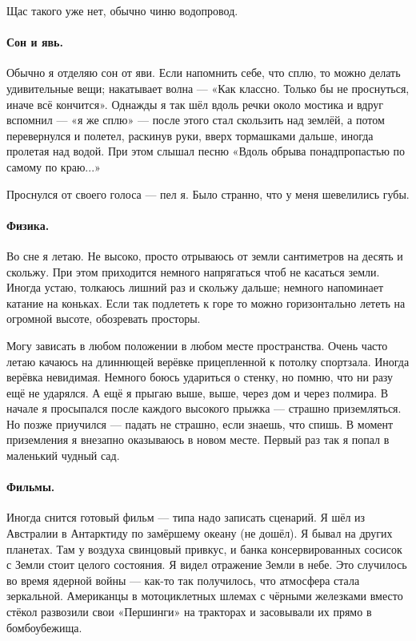\documentclass{book}
\begin{document}
Щас такого уже нет, обычно чиню водопровод.

\paragraph{Сон и явь.}
Обычно я отделяю сон от яви.
Если напомнить себе, что сплю, то можно делать удивительные вещи;
накатывает волна --- «Как классно. Только бы не проснуться, иначе всё кончится».
Однажды я так шёл вдоль речки около мостика и вдруг вспомнил --- «я же сплю» --- после этого стал скользить над землёй, а потом перевернулся и полетел, раскинув руки, вверх тормашками дальше, иногда пролетая над водой.
При этом слышал песню «Вдоль обрыва понадпропастью по самому по краю...»

Проснулся от своего голоса --- пел я.
Было странно, что у меня шевелились губы.

\paragraph{Физика.}
Во сне я летаю.
Не высоко, просто отрываюсь от земли сантиметров на десять и скольжу.
При этом приходится немного напрягаться чтоб не касаться земли.
Иногда устаю, толкаюсь лишний раз и скольжу дальше; немного напоминает катание на коньках.
Если так подлететь к горе то можно горизонтально лететь на огромной высоте,
обозревать просторы.

Могу зависать в любом положении в любом месте пространства.
Очень часто летаю качаюсь на длиннющей верёвке прицепленной к потолку спортзала.
Иногда верёвка невидимая.
Немного боюсь удариться о стенку, но помню, что ни разу ещё не ударялся.
А ещё я прыгаю выше, выше, через дом и через полмира.
В начале я просыпался после каждого высокого прыжка --- страшно приземляться.
Но позже приучился --- падать не страшно, если знаешь, что спишь.
В момент приземления я внезапно оказываюсь в новом месте.
Первый раз так я попал в маленький чудный сад.

\paragraph{Фильмы.}
Иногда снится готовый фильм --- типа надо записать сценарий.
Я шёл из Австралии в Антарктиду по замёршему океану (не дошёл).
Я бывал на других планетах.
Там у воздуха свинцовый привкус, и банка консервированных сосисок с Земли стоит целого состояния.
Я видел отражение Земли в небе.
Это случилось во время ядерной войны --- как-то так получилось, что атмосфера стала зеркальной.
Американцы в мотоциклетных шлемах с чёрными железками вместо стёкол развозили свои «Першинги» на тракторах и засовывали их прямо в бомбоубежища.
\end{document}
